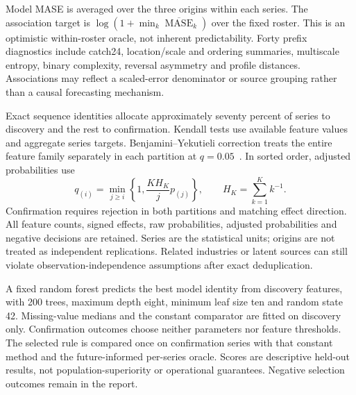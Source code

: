 \documentclass[11pt,a4paper]{article}
\begin{document}
Model MASE is averaged over the three origins within each series. The association target is $\log(1+\min_k\overline{\operatorname{MASE}}_k)$ over the fixed roster. This is an optimistic within-roster oracle, not inherent predictability. Forty prefix diagnostics include catch24, location/scale and ordering summaries, multiscale entropy, binary complexity, reversal asymmetry and profile distances. Associations may reflect a scaled-error denominator or source grouping rather than a causal forecasting mechanism.

Exact sequence identities allocate approximately seventy percent of series to discovery and the rest to confirmation. Kendall tests use available feature values and aggregate series targets. Benjamini--Yekutieli correction treats the entire feature family separately in each partition at $q=0.05$~\cite{freshby}. In sorted order, adjusted probabilities use
\begin{equation}
 q_{(i)}=\min_{j\ge i}\left\{1,\frac{K H_K}{j}p_{(j)}\right\},\qquad H_K=\sum_{k=1}^{K}k^{-1}.
\end{equation}
Confirmation requires rejection in both partitions and matching effect direction. All feature counts, signed effects, raw probabilities, adjusted probabilities and negative decisions are retained. Series are the statistical units; origins are not treated as independent replications. Related industries or latent sources can still violate observation-independence assumptions after exact deduplication.

A fixed random forest predicts the best model identity from discovery features, with 200 trees, maximum depth eight, minimum leaf size ten and random state 42. Missing-value medians and the constant comparator are fitted on discovery only. Confirmation outcomes choose neither parameters nor feature thresholds. The selected rule is compared once on confirmation series with that constant method and the future-informed per-series oracle. Scores are descriptive held-out results, not population-superiority or operational guarantees. Negative selection outcomes remain in the report.
\end{document}
